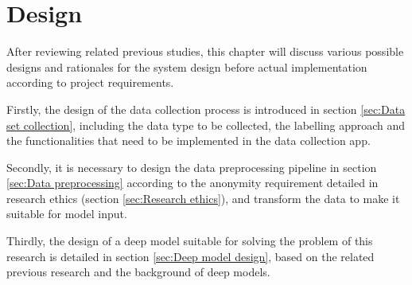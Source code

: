 \chapter{Design}
\label{chap:Design}
After reviewing related previous studies, this chapter will discuss various possible designs and rationales for the system design before actual implementation according to project requirements.

Firstly, the design of the data collection process is introduced in section \ref{sec:Data set collection}, including the data type to be collected, the labelling approach and the functionalities that need to be implemented in the data collection app.

Secondly, it is necessary to design the data preprocessing pipeline in section \ref{sec:Data preprocessing} according to the anonymity requirement detailed in research ethics (section \ref{sec:Research ethics}), and transform the data to make it suitable for model input.

Thirdly, the design of a deep model suitable for solving the problem of this research is detailed in section \ref{sec:Deep model design}, based on the related previous research and the background of deep models.



